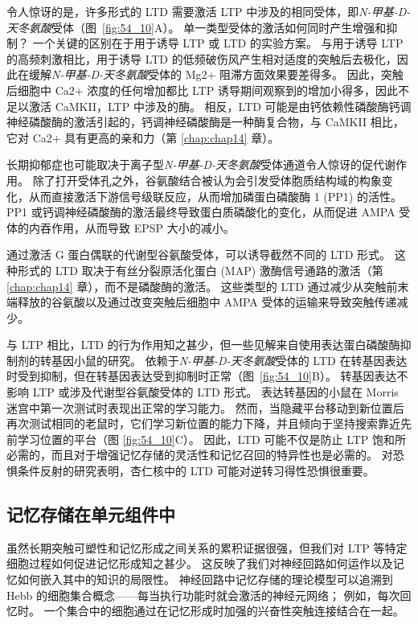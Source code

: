 令人惊讶的是，许多形式的 LTD 需要激活 LTP 中涉及的相同受体，即\textit{N-甲基-D-天冬氨酸}受体（图~\ref{fig:54_10}A）。
单一类型受体的激活如何同时产生增强和抑制？
一个关键的区别在于用于诱导 LTP 或 LTD 的实验方案。
与用于诱导 LTP 的高频刺激相比，用于诱导 LTD 的低频破伤风产生相对适度的突触后去极化，因此在缓解\textit{N-甲基-D-天冬氨酸}受体的 Mg2+ 阻滞方面效果要差得多。
因此，突触后细胞中 Ca2+ 浓度的任何增加都比 LTP 诱导期间观察到的增加小得多，因此不足以激活 CaMKII，LTP 中涉及的酶。
相反，LTD 可能是由钙依赖性磷酸酶钙调神经磷酸酶的激活引起的，钙调神经磷酸酶是一种酶复合物，与 CaMKII 相比，它对 Ca2+ 具有更高的亲和力（第 \ref{chap:chap14} 章）。


长期抑郁症也可能取决于离子型\textit{N-甲基-D-天冬氨酸}受体通道令人惊讶的促代谢作用。
除了打开受体孔之外，谷氨酸结合被认为会引发受体胞质结构域的构象变化，从而直接激活下游信号级联反应，从而增加磷蛋白磷酸酶 1 (PP1) 的活性。
PP1 或钙调神经磷酸酶的激活最终导致蛋白质磷酸化的变化，从而促进 AMPA 受体的内吞作用，从而导致 EPSP 大小的减小。


通过激活 G 蛋白偶联的代谢型谷氨酸受体，可以诱导截然不同的 LTD 形式。
这种形式的 LTD 取决于有丝分裂原活化蛋白 (MAP) 激酶信号通路的激活（第 \ref{chap:chap14} 章），而不是磷酸酶的激活。
这些类型的 LTD 通过减少从突触前末端释放的谷氨酸以及通过改变突触后细胞中 AMPA 受体的运输来导致突触传递减少。


与 LTP 相比，LTD 的行为作用知之甚少，但一些见解来自使用表达蛋白磷酸酶抑制剂的转基因小鼠的研究。
依赖于\textit{N-甲基-D-天冬氨酸}受体的 LTD 在转基因表达时受到抑制，但在转基因表达受到抑制时正常（图~\ref{fig:54_10}B）。
转基因表达不影响 LTP 或涉及代谢型谷氨酸受体的 LTD 形式。
表达转基因的小鼠在 Morris 迷宫中第一次测试时表现出正常的学习能力。
然而，当隐藏平台移动到新位置后再次测试相同的老鼠时，它们学习新位置的能力下降，并且倾向于坚持搜索靠近先前学习位置的平台（图 \ref{fig:54_10}C）。
因此，LTD 可能不仅是防止 LTP 饱和所必需的，而且对于增强记忆存储的灵活性和记忆召回的特异性也是必需的。
对恐惧条件反射的研究表明，杏仁核中的 LTD 可能对逆转习得性恐惧很重要。



\subsection{记忆存储在单元组件中}

虽然长期突触可塑性和记忆形成之间关系的累积证据很强，但我们对 LTP 等特定细胞过程如何促进记忆形成知之甚少。
这反映了我们对神经回路如何运作以及记忆如何嵌入其中的知识的局限性。
神经回路中记忆存储的理论模型可以追溯到 Hebb 的细胞集合概念——每当执行功能时就会激活的神经元网络；
例如，每次回忆时。
一个集合中的细胞通过在记忆形成时加强的兴奋性突触连接结合在一起。


